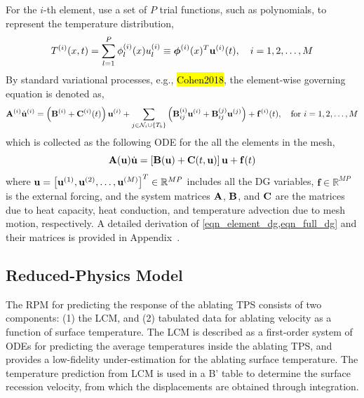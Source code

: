 For the $i$-th element, use a set of $P$ trial functions, such as polynomials, to represent the temperature distribution,
\begin{equation}
    T^{(i)}(x,t) = \sum_{l=1}^{P} \phi_l^{(i)}(x)u_l^{(i)} \equiv \boldsymbol{\phi}^{(i)}(x)^T\mathbf{u}^{(i)}(t),\quad i=1,2,\dots,M\label{eqn_element_temperature}
\end{equation}
By standard variational processes, e.g., \hl{Cohen2018}, the element-wise governing equation is denoted as,
\begin{equation}
    \mathbf{A}^{(i)}\dot{\mathbf{u}}^{(i)} = \left(\mathbf{B}^{(i)} + \mathbf{C}^{(i)}(t)\right)\mathbf{u}^{(i)} + \sum_{j\in\mathcal{N}_i\cup\left\{T_b\right\}}\left(\mathbf{B}^{(i)}_{ij}\mathbf{u}^{(i)} + \mathbf{B}^{(j)}_{ij}\mathbf{u}^{(j)}\right) + \mathbf{f}^{(i)}(t),\quad\text{for }i=1,2,\dots,M\label{eqn_element_dg}
\end{equation}
which is collected as the following ODE for the all the elements in the mesh,
\begin{equation}
    \mathbf{A}(\mathbf{u})\dot{\mathbf{u}} = \left[\mathbf{B}(\mathbf{u}) + \mathbf{C}(t,\mathbf{u})\right]\mathbf{u} + \mathbf{f}(t)\label{eqn_full_dg}
\end{equation}
where $\mathbf{u} = \left[\mathbf{u}^{(1)}, \mathbf{u}^{(2)}, \ldots, \mathbf{u}^{(M)}\right]^T\in\mathbb{R}^{MP}$ includes all the DG variables, $\mathbf{f}\in\mathbb{R}^{MP}$ is the external forcing, and the system matrices $\mathbf{A}$, $\mathbf{B}$, and $\mathbf{C}$ are the matrices due to heat capacity, heat conduction, and temperature advection due to mesh motion, respectively. A detailed derivation of \cref{eqn_element_dg,eqn_full_dg} and their matrices is provided in Appendix~\cite{appendix}.

\subsection{Reduced-Physics Model}
The RPM for predicting the response of the ablating TPS consists of two components: (1) the LCM, and (2) tabulated data for ablating velocity as a function of surface temperature. The LCM is described as a first-order system of ODEs for predicting the average temperatures inside the ablating TPS, and provides a low-fidelity under-estimation for the ablating surface temperature. The temperature prediction from LCM is used in a B' table to determine the surface recession velocity, from which the displacements are obtained through integration.

